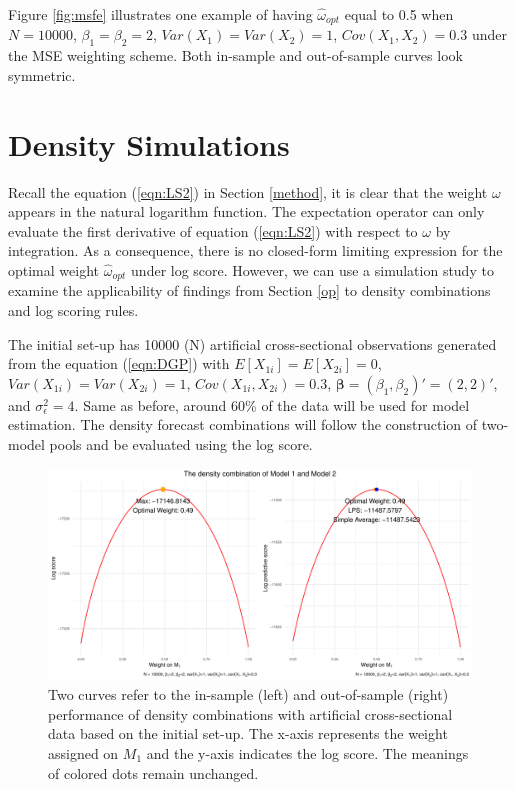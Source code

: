 \documentclass{monashthesis}
\begin{document}
Figure \ref{fig:msfe} illustrates one example of having \(\hat\omega_{opt}\) equal to 0.5 when \(N = 10000\), \(\beta_1=\beta_2=2\), \(Var(X_1)=Var(X_2)=1\), \(Cov(X_1,X_2)=0.3\) under the MSE weighting scheme. Both in-sample and out-of-sample curves look symmetric.

\hypertarget{density-simulations}{%
\section{Density Simulations}\label{density-simulations}}

Recall the equation (\ref{eqn:LS2}) in Section \ref{method}, it is clear that the weight \(\omega\) appears in the natural logarithm function. The expectation operator can only evaluate the first derivative of equation (\ref{eqn:LS2}) with respect to \(\omega\) by integration. As a consequence, there is no closed-form limiting expression for the optimal weight \(\hat\omega_{opt}\) under log score. However, we can use a simulation study to examine the applicability of findings from Section \ref{op} to density combinations and log scoring rules.

The initial set-up has 10000 (N) artificial cross-sectional observations generated from the equation (\ref{eqn:DGP}) with \(E[X_{1i}] = E[X_{2i}] = 0\), \(Var(X_{1i}) = Var(X_{2i}) = 1\), \(Cov(X_{1i}, X_{2i}) = 0.3\), \(\pmb{\beta} = (\beta_1, \beta_2)' = (2,2)'\), and \(\sigma^2_{\epsilon}=4\). Same as before, around 60\% of the data will be used for model estimation. The density forecast combinations will follow the construction of two-model pools and be evaluated using the log score.

\begin{figure}[ht]
\centering
\includegraphics[scale=0.6]{figures/LPS_10000.pdf}
\caption{Two curves refer to the in-sample (left) and out-of-sample (right) performance of density combinations with artificial cross-sectional data based on the initial set-up. The x-axis represents the weight assigned on $M_1$ and the y-axis indicates the log score. The meanings of colored dots remain unchanged.}
\label{fig:ss10000}
\end{figure}
\end{document}
